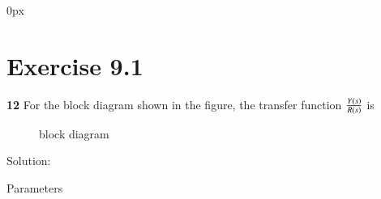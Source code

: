 \documentclass[journal,12pt,twocolumn]{IEEEtran}
\theoremstyle{remark}
\begin{document}
\parindent 0px


\vspace{3cm}

\title{}
\author{EE23BTECH11217 - Prajwal M$^{*}$
}
\maketitle
\newpage
\bigskip



\section*{Exercise 9.1}

\noindent \textbf{12} \hspace{2pt}For the block diagram shown in the figure, the transfer function $\frac{Y\left(s\right)}{R\left(s\right)}$ is \\
\begin{figure}[h]
    \centering
    
    \caption{block diagram}
    \label{fig: 217.9.1.12.1}
\end{figure}

Solution:\\
\begin{table}[h]
    \centering
    
    \caption{Parameters}
    \label{tab: 217.9.1.12.1}
\end{table}
\end{document}
